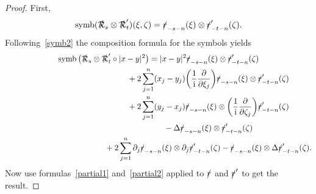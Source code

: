 \documentclass[pdftex]{sigma}
\DeclareMathOperator{\symb}{symb}
\newcommand{\fsl}[1]{{\slashed{#1}}} %
\numberwithin{equation}{section}
\begin{document}
\begin{proof}
First,
\begin{gather*}
\symb(\fsl{\mathcal R}_s\otimes \fsl{\mathcal R}'_t)(\xi,\zeta) = \fsl{r}_{-s-n} (\xi)\otimes \fsl{r}'_{-t-n}(\zeta) .
\end{gather*}
Following~\eqref{symb2} the composition formula for the symbols yields
\begin{gather*}
\symb\big(\fsl{\mathcal R}_s\otimes \fsl{\mathcal R}'_t\circ \vert x-y\vert^2\big)
 = \vert x-y\vert^2\fsl{r}_{-s-n}(\xi)\otimes \fsl{r}'_{-t-n}(\zeta)
\\ \hphantom{\symb\big(\fsl{\mathcal R}_s\otimes \fsl{\mathcal R}'_t\circ \vert x-y\vert^2\big) =}
{}+ 2\sum_{j=1}^n (x_j-y_j)\bigg(\frac{1}{\rm i}\frac{\partial}{\partial \xi_j}\bigg) \fsl{r}_{-s-n}(\xi)\otimes \fsl{r}'_{-t-n}(\zeta)
\\ \hphantom{\symb\big(\fsl{\mathcal R}_s\otimes \fsl{\mathcal R}'_t\circ \vert x-y\vert^2\big) =}
{}+2\sum_{j=1}^n (y_j-x_j) \fsl{r}_{-s-n}(\xi)\otimes \bigg(\frac{1}{\rm i}\frac{\partial}{\partial \zeta_j} \bigg)\fsl{r}'_{-t-n}(\zeta)
\\ \hphantom{\symb\big(\fsl{\mathcal R}_s\otimes \fsl{\mathcal R}'_t\circ \vert x-y\vert^2\big) =}
{}-\Delta \fsl{r}_{-s-n}(\xi)\otimes \fsl{r}'_{-t-n}(\zeta)
\\ \hphantom{\symb\big(\fsl{\mathcal R}_s\otimes \fsl{\mathcal R}'_t\circ \vert x-y\vert^2\big) =}
{}+2\sum_{j=1}^n \partial_j\fsl{r}_{-s-n}(\xi)\otimes \partial_j \fsl{r}'_{-t-n}(\zeta)- \fsl{r}_{-s-n}(\xi)\otimes \Delta \fsl{r}'_{-t-n}(\zeta).
\end{gather*}
Now use formulas~\eqref{partial1} and~\eqref{partial2} applied to $\fsl{r} $ and $ \fsl{r}'$ to get the result.
\end{proof}
\end{document}
